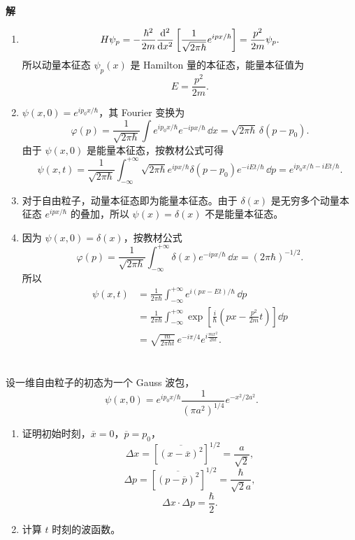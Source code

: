 \documentclass[10pt,a4paper]{article}
\begin{document}
\noindent\textbf{解}
\begin{enumerate}[label=(\alph*)]
  \item
  \[
  H\psi_p = -\frac{\hbar^2}{2m}\dv[2]{}{x}\left[\frac{1}{\sqrt{2\pi\hbar}}e^{ipx/\hbar}\right]
  = \frac{p^2}{2m}\psi_p.
  \]
  所以动量本征态 $\psi_p(x)$ 是 Hamilton 量的本征态，能量本征值为
  \[
  E = \frac{p^2}{2m}.
  \]

  \item $\psi(x,0)=e^{ip_0x/\hbar}$，其 Fourier 变换为
  \[
  \varphi(p)=\frac{1}{\sqrt{2\pi\hbar}}\int e^{ip_0x/\hbar}e^{-ipx/\hbar}\, \dd x
  = \sqrt{2\pi\hbar}\,\delta(p-p_0).
  \]
  由于 $\psi(x,0)$ 是能量本征态，按教材公式可得
  \[
  \psi(x,t)=\frac{1}{\sqrt{2\pi\hbar}}\int_{-\infty}^{+\infty}\sqrt{2\pi\hbar}
  e^{ipx/\hbar}\delta(p-p_0)e^{-iEt/\hbar}\, \dd p
  = e^{ip_0x/\hbar - iEt/\hbar}.
  \]

  \item 对于自由粒子，动量本征态即为能量本征态。由于 $\delta(x)$ 是无穷多个动量本征态 $e^{ipx/\hbar}$ 的叠加，所以 $\psi(x)=\delta(x)$ 不是能量本征态。

  \item 因为 $\psi(x,0)=\delta(x)$，按教材公式
  \[
  \varphi(p)=\frac{1}{\sqrt{2\pi\hbar}}\int_{-\infty}^{+\infty}\delta(x)e^{-ipx/\hbar}\, \dd x=(2\pi\hbar)^{-1/2}.
  \]
  所以
  \begin{align*}
  \psi(x,t)&=\frac{1}{2\pi\hbar}\int_{-\infty}^{+\infty}e^{i(px-Et)/\hbar}\, \dd p\\
  &= \frac{1}{2\pi\hbar}\int_{-\infty}^{+\infty}\exp\left[\frac{i}{\hbar}\left(px-\frac{p^2}{2m}t\right)\right]\dd p\\
  &= \sqrt{\frac{m}{2\pi\hbar t}}\, e^{-i\pi/4} e^{i\frac{mx^2}{2\hbar t}}.
  \end{align*}  
\end{enumerate}

\section{}
设一维自由粒子的初态为一个 Gauss 波包，
\[
\psi(x,0)=e^{ip_0x/\hbar}\frac{1}{(\pi a^2)^{1/4}}e^{-x^2/2a^2}.
\]

\begin{enumerate}[label=(\arabic*)]
    \item 证明初始时刻，$\overline x = 0$，$\overline p = p_0$，
      \[
      \Delta x = \left[\overline{(x-\overline x)^2}\right]^{1/2}=\frac{a}{\sqrt{2}},
      \]
      \[
      \Delta p = \left[\overline{(p-\overline p)^2}\right]^{1/2}=\frac{\hbar}{\sqrt{2}a},
      \]
      \[
      \Delta x\cdot \Delta p = \frac{\hbar}{2}.
      \]
    \item 计算 $t$ 时刻的波函数。
\end{enumerate}
\end{document}
